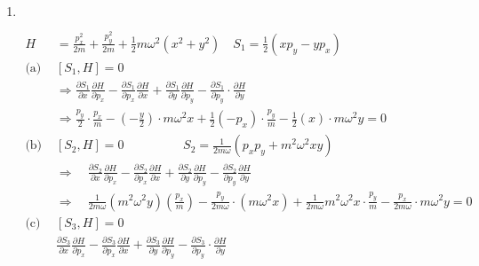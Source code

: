 \begin{enumerate}
\begin{answer}
\begin{align}
{		\quad \because q=\frac{1}{P}	$}\notag
	H&=\frac{p^{2}}{2 m}-\frac{1}{2} m \omega^{2} q^{2}=\frac{Q^{2} P^{4}}{2 m}-\frac{1}{2} m \omega^{2}\left(\frac{1}{P^{2}}\right)=\frac{1}{2 m} Q^{2} P^{4}-\frac{1}{2} m \omega^{2} P^{-2}\notag
	\end{align}
\end{answer}
	\item $\left. \right. $
\begin{answer}
	\begin{align*}
		H&=\frac{p_{x}^{2}}{2 m}+\frac{p_{y}^{2}}{2 m}+\frac{1}{2} m \omega^{2}\left(x^{2}+y^{2}\right) \quad S_{1}=\frac{1}{2}\left(x p_{y}-y p_{x}\right)\\
		\text{(a) }&\left[S_{1}, H\right]=0\\
		&\Rightarrow \frac{\partial S_{1}}{\partial x} \frac{\partial H}{\partial p_{x}}-\frac{\partial S_{1}}{\partial p_{x}} \frac{\partial H}{\partial x}+\frac{\partial S_{1}}{\partial y} \frac{\partial H}{\partial p_{y}}-\frac{\partial S_{1}}{\partial p_{y}} \cdot \frac{\partial H}{\partial y} \\
		&\Rightarrow \frac{p_{y}}{2} \cdot \frac{p_{x}}{m}-\left(-\frac{y}{2}\right) \cdot m \omega^{2} x+\frac{1}{2}\left(-p_{x}\right) \cdot \frac{p_{y}}{m}-\frac{1}{2}(x) \cdot m \omega^{2} y=0\\
		\text{(b) }&\left[S_{2}, H\right]=0\hspace{2cm}
		S_{2}=\frac{1}{2 m \omega}\left(p_{x} p_{y}+m^{2} \omega^{2} x y\right)\\
		&\Rightarrow \quad \frac{\partial S_{2}}{\partial x} \frac{\partial H}{\partial p_{x}}-\frac{\partial S_{2}}{\partial p_{x}} \frac{\partial H}{\partial x}+\frac{\partial S_{2}}{\partial y} \frac{\partial H}{\partial p_{y}}-\frac{\partial S_{2}}{\partial p_{y}} \frac{\partial H}{\partial y}\\
		&\Rightarrow \quad \frac{1}{2 m \omega}\left(m^{2} \omega^{2} y\right)\left(\frac{p_{x}}{m}\right)-\frac{p_{y}}{2 m \omega} \cdot\left(m \omega^{2} x\right)+\frac{1}{2 m \omega} m^{2} \omega^{2} x \cdot \frac{p_{y}}{m}-\frac{p_{x}}{2 m \omega} \cdot m \omega^{2} y=0\\
		\text{(c) }&\left[S_{3}, H\right]=0\\
		&\frac{\partial S_{3}}{\partial x} \frac{\partial H}{\partial p_{x}}-\frac{\partial S_{3}}{\partial p_{x}} \frac{\partial H}{\partial x}+\frac{\partial S_{3}}{\partial y} \frac{\partial H}{\partial p_{y}}-\frac{\partial S_{3}}{\partial p_{y}} \cdot \frac{\partial H}{\partial y} \\

\end{align*}
\end{answer}
\end{enumerate}
